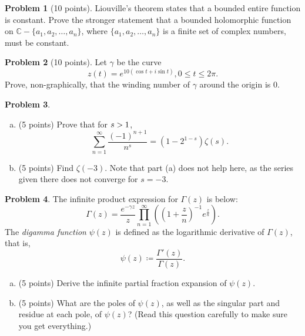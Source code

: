 \documentclass[11pt,oneside]{amsart}
\theoremstyle{definition}
\newtheorem{problem}{Problem}
\newcommand{\bC}{\mathbb{C}}
\let\Re\relax
\DeclareMathOperator{\Re}{Re}
\begin{document}
\newpage

\begin{problem}[10 points]
Liouville's theorem states that a bounded entire function is constant. Prove the stronger statement that a bounded holomorphic function on $\bC-\{a_1,a_2,\dots,a_n\}$, where $\{a_1,a_2,\dots,a_n\}$ is a finite set of complex numbers, must be constant.
\end{problem}

\newpage

\begin{problem}[10 points]
  Let $\gamma$ be the curve
  \[z(t)=e^{10(\cos t+i\sin t)}, 0\leq t\leq 2\pi.\]
  Prove, non-graphically, that the winding number of $\gamma$ around the origin is 0.
\end{problem}

\newpage

\begin{problem}
  \leavevmode\begin{enumerate}[(a)]
    \item (5 points) Prove that for $\Re s>1$,
    \[\sum_{n=1}^\infty\frac{(-1)^{n+1}}{n^s}=(1-2^{1-s})\zeta(s).\]
    \vfill
    \item (5 points) Find $\zeta(-3)$. Note that part (a) does not help here, as the series given there does not converge for $s=-3$.
    \vfill
  \end{enumerate}
\end{problem}

\newpage

\begin{problem}
  The infinite product expression for $\Gamma(z)$ is below:
  \[\Gamma(z)=\frac{e^{-\gamma z}}z\prod_{n=1}^\infty \left(\left( 1+\frac zn \right)^{-1}e^{\frac zn}\right).\]
  The \emph{digamma function} $\psi(z)$ is defined as the logarithmic derivative of $\Gamma(z)$, that is,
  \[\psi(z)\coloneqq\frac{\Gamma'(z)}{\Gamma(z)}.\]
  \begin{enumerate}[(a)]
    \item (5 points) Derive the infinite partial fraction expansion of $\psi(z)$.
    \vfill
    \item (5 points) What are the poles of $\psi(z)$, as well as the singular part and residue at each pole, of $\psi(z)$? (Read this question carefully to make sure you get everything.)
    \vfill
  \end{enumerate}
\end{problem}
\end{document}
